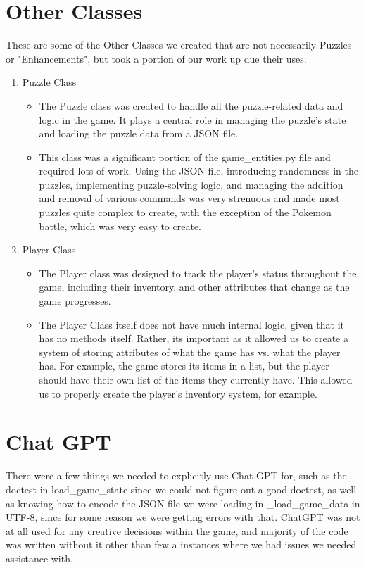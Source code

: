 \documentclass[11pt]{article}
\begin{document}
\section*{Other Classes}
These are some of the Other Classes we created that are not necessarily Puzzles or "Enhancements", but took a portion of our work up due their uses.
\begin{enumerate}
\item Puzzle Class
    \begin{itemize}
       \item The Puzzle class was created to handle all the puzzle-related data and logic in the game. It plays a central role in managing the puzzle’s state and loading the puzzle data from a JSON file.
       \item This class was a significant portion of the game\_entities.py file and required lots of work. Using the JSON file, introducing randomness in the puzzles, implementing puzzle-solving logic, and managing the addition and removal of various commands was very strenuous and made most puzzles quite complex to create, with the exception of the Pokemon battle, which was very easy to create.
    \end{itemize}
    \item Player Class
    \begin{itemize}
        \item The Player class was designed to track the player’s  status throughout the game, including their inventory, and other attributes that change as the game progresses.
       \item The Player Class itself does not have much internal logic, given that it has no methods itself. Rather, its important as it allowed us to create a system of storing attributes of what the game has vs. what the player has. For example, the game stores its items in a list, but the player should have their own list of the items they currently have. This allowed us to properly create the player's inventory system, for example.
    \end{itemize}
\end{enumerate}

\section*{Chat GPT}
There were a few things we needed to explicitly use Chat GPT for, such as the doctest in load\_game\_state since we could not figure out a good doctest, as well as knowing how to encode the JSON file we were loading in \_load\_game\_data in UTF-8, since for some reason we were getting errors with that. ChatGPT was not at all used for any creative decisions within the game, and majority of the code was written without it other than few a instances where we had issues we needed assistance with.
\end{document}

